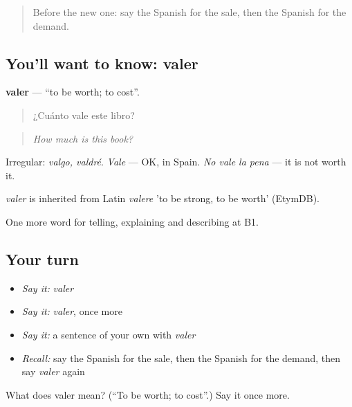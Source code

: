 \label{lesson:ES-C631-valer}



\begin{quote}
Before the new one: say the Spanish for the sale, then the Spanish for the demand.
\end{quote}

\subsection*{You'll want to know: valer}
\textbf{valer} — \textquotedblleft{}to be worth; to cost\textquotedblright{}.

\begin{quote}
¿Cuánto vale este libro?
\end{quote}

\begin{quote}
\emph{How much is this book?}
\end{quote}

Irregular: \emph{valgo, valdré}. \emph{Vale} — OK, in Spain. \emph{No vale la pena} — it is not worth it.

\begin{cousinweb}
\emph{valer} is inherited from Latin \emph{valere} 'to be strong, to be worth' (EtymDB).
\end{cousinweb}

\begin{grammarlens}[title={What you've built}]
One more word for telling, explaining and describing at B1.
\end{grammarlens}

\subsection*{Your turn}
\begin{itemize}
\raggedright
  \item \emph{Say it:} \emph{valer}
  \item \emph{Say it:} \emph{valer}, once more
  \item \emph{Say it:} a sentence of your own with \emph{valer}
  \item \emph{Recall:} say the Spanish for the sale, then the Spanish for the demand, then say \emph{valer} again
\end{itemize}

\begin{tcolorbox}[breakable,colback=teal!4,colframe=teal!35!black,title={Before you move on}]
What does valer mean? (\textquotedblleft{}To be worth; to cost\textquotedblright{}.) Say it once more.
\end{tcolorbox}
